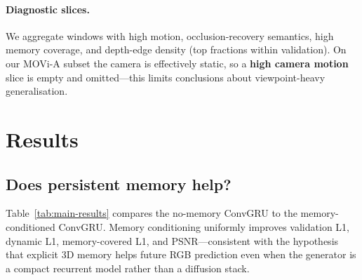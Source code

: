 \documentclass[11pt]{article}
\begin{document}
\paragraph{Diagnostic slices.}
We aggregate windows with high motion, occlusion-recovery semantics, high memory coverage, and depth-edge
density (top fractions within validation). On our MOVi-A subset the camera is effectively static, so a
\textbf{high camera motion} slice is empty and omitted---this limits conclusions about viewpoint-heavy
generalisation.

\section{Results}
\label{sec:results}

\subsection{Does persistent memory help?}

Table~\ref{tab:main-results} compares the no-memory ConvGRU to the memory-conditioned ConvGRU.
Memory conditioning uniformly improves validation L1, dynamic L1, memory-covered L1, and PSNR---consistent
with the hypothesis that explicit 3D memory helps future RGB prediction even when the generator is a compact
recurrent model rather than a diffusion stack.

\begin{table}[!htb]
\centering
{}
\caption{Unified validation metrics (320 windows). Metrics read from the unified evaluation JSON file under
\texttt{outputs/eval\_final/} (checkpoints trained under \texttt{outputs/local\_movia200\_64\_convgru\_*\_v1}).}
\label{tab:main-results}
\end{table}
\end{document}
